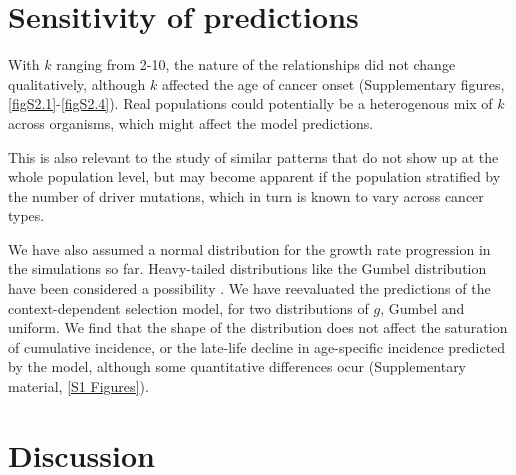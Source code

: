 \documentclass[9pt,onecolumn,twoside]{pnas-new}
\begin{document}
\section*{Sensitivity of predictions}

With $k$ ranging from 2-10, the nature of the relationships did not change qualitatively, although $k$ affected the age of cancer onset (Supplementary figures, \ref{figS2.1}-\ref{figS2.4}). Real populations could potentially be a heterogenous mix of $k$ across organisms, which might affect the model predictions. 

This is also relevant to the study of similar patterns that do not show up at the whole population level, but may become apparent if the population stratified by the number of driver mutations, which in turn is known to vary across cancer types.

We have also assumed a normal distribution for the growth rate progression in the simulations so far. Heavy-tailed distributions like the Gumbel distribution have been considered a possibility \cite{Durrett2010}. We have reevaluated the predictions of the context-dependent selection model, for two distributions of $g$, Gumbel and uniform. We find that the shape of the distribution does not affect the saturation of cumulative incidence, or the late-life decline in age-specific incidence predicted by the model, although some quantitative differences ocur (Supplementary material, \ref{S1 Figures}).

\section*{Discussion}
\end{document}
